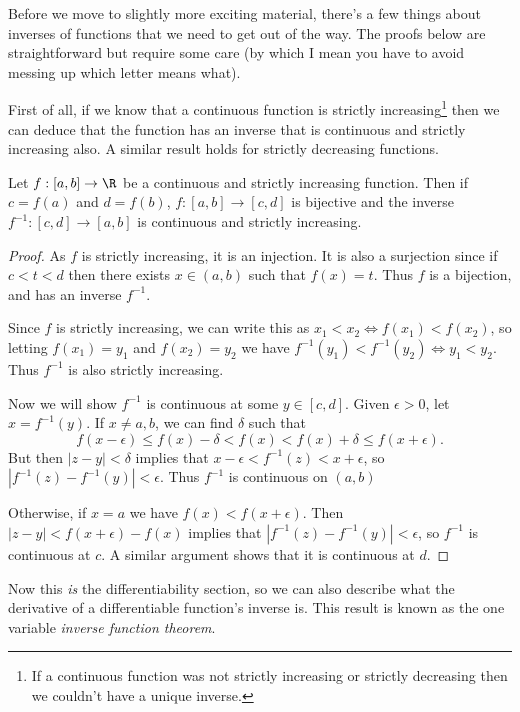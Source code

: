 \documentclass[a4paper]{scrartcl}
\begin{document}
Before we move to slightly more exciting material, there's a few things about inverses of functions that we need to get out of the way. The proofs below are straightforward but require some care (by which I mean you have to avoid messing up which letter means what).

First of all, if we know that a continuous function is strictly increasing\footnote{If a continuous function was not strictly increasing or strictly decreasing then we couldn't have a unique inverse.} then we can deduce that the function has an inverse that is continuous and strictly increasing also. A similar result holds for strictly decreasing functions.

\begin{theorem}
	Let $f:[a, b] \rightarrow \R$ be a continuous and strictly increasing function. Then if $c = f(a)$ and $d = f(b)$, $f:[a, b] \rightarrow [c, d]$ is bijective and the inverse $f^{-1}: [c, d] \rightarrow [a, b]$ is continuous and strictly increasing.
\end{theorem}
\begin{proof}
	As $f$ is strictly increasing, it is an injection. It is also a surjection since if $c < t < d$ then there exists $x \in (a, b)$ such that $f(x) = t$. Thus $f$ is a bijection, and has an inverse $f^{-1}$.

	Since $f$ is strictly increasing, we can write this as $x_1 < x_2 \iff f(x_1) < f(x_2)$, so letting $f(x_1) = y_1$ and $f(x_2) = y_2$ we have 
	$f^{-1}(y_1) < f^{-1}(y_2) \iff y_1 < y_2$. Thus $f^{-1}$ is also strictly increasing.
	
	Now we will show $f^{-1}$ is continuous at some $y \in [c, d]$.
	Given $\epsilon > 0$, 
	let $x = f^{-1}(y)$. If $x \neq a, b$, we can find $\delta$ such that
	$$
		f(x - \epsilon) \leq f(x) - \delta < f(x) < f(x) + \delta \leq f(x + \epsilon).
	$$
	But then $|z - y| < \delta$ implies that $x - \epsilon < f^{-1}(z) < x + \epsilon$, so $|f^{-1}(z) - f^{-1}(y)| < \epsilon$.
	Thus $f^{-1}$ is continuous on $(a, b)$

	Otherwise, if $x = a$ we have $f(x) < f(x + \epsilon)$. Then $|z - y| < f(x + \epsilon) - f(x)$ implies that $|f^{-1}(z) - f^{-1}(y)| < \epsilon$, so $f^{-1}$ is continuous at $c$. A similar argument shows that it is continuous at $d$.
\end{proof}

Now this \emph{is} the differentiability section, so we can also describe what the derivative of a differentiable function's inverse is. This result is known as the one variable \emph{inverse function theorem}.
\end{document}
